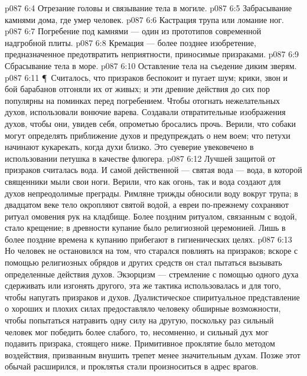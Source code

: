 \vs p087 6:4 \bibnobreakspace Отрезание головы и связывание тела в могиле.
\vs p087 6:5 \bibnobreakspace Забрасывание камнями дома, где умер человек.
\vs p087 6:6 \bibnobreakspace Кастрация трупа или ломание ног.
\vs p087 6:7 \bibnobreakspace Погребение под камнями --- один из прототипов современной надгробной плиты.
\vs p087 6:8 \bibnobreakspace Кремация --- более позднее изобретение, предназначенное предотвратить неприятности, приносимые призраками.
\vs p087 6:9 \bibnobreakspace Сбрасывание тела в море.
\vs p087 6:10 \bibnobreakspace Оставление тела на съедение диким зверям.
\vs p087 6:11 \P\ Считалось, что призраков беспокоит и пугает шум; крики, звон и бой барабанов отгоняли их от живых; и эти древние действия до сих пор популярны на поминках перед погребением. Чтобы отогнать нежелательных духов, использовали вонючие варева. Создавали отвратительные изображения духов, чтобы они, увидев себя, опрометью бросались прочь. Верили, что собаки могут определять приближение духов и предупреждать о нем воем; что петухи начинают кукарекать, когда духи близко. Это суеверие увековечено в использовании петушка в качестве флюгера.
\vs p087 6:12 Лучшей защитой от призраков считалась вода. И самой действенной --- святая вода --- вода, в которой священники мыли свои ноги. Верили, что как огонь, так и вода создают для духов непреодолимые преграды. Римляне трижды обносили воду вокруг трупа; в двадцатом веке тело окропляют святой водой, а евреи по\hyp{}прежнему сохраняют ритуал омовения рук на кладбище. Более поздним ритуалом, связанным с водой, стало крещение; в древности купание было религиозной церемонией. Лишь в более поздние времена к купанию прибегают в гигиенических целях.
\vs p087 6:13 Но человек не остановился на том, что старался повлиять на призраков; вскоре с помощью религиозных обрядов и других средств он стал пытаться вызывать определенные действия духов. Экзорцизм --- стремление с помощью одного духа сдерживать или изгонять другого, эта же тактика использовалась и для того, чтобы напугать призраков и духов. Дуалистическое спиритуальное представление о хороших и плохих силах предоставляло человеку обширные возможности, чтобы попытаться натравить одну силу на другую, поскольку раз сильный человек мог победить более слабого, то, несомненно, и сильный дух мог подавить призрака, стоящего ниже. Примитивное проклятие было методом воздействия, призванным внушить трепет менее значительным духам. Позже этот обычай расширился, и проклятья стали произноситься в адрес врагов.
